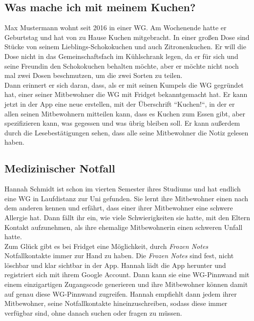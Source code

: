 \documentclass[a4paper]{scrreprt}
\begin{document}
        \subsection{Was mache ich mit meinem Kuchen?}
        Max Mustermann wohnt seit 2016 in einer WG. Am Wochenende hatte er Geburtstag und hat von zu Hause Kuchen mitgebracht. In einer großen Dose sind Stücke von seinem Lieblings-Schokokuchen und auch Zitronenkuchen. Er will die Dose nicht in das Gemeinschaftsfach im Kühlschrank legen, da er für sich und seine Freundin den Schokokuchen behalten möchte, aber er möchte nicht noch mal zwei Dosen beschmutzen, um die zwei Sorten zu teilen.\\
        Dann erinnert er sich daran, dass, als er mit seinen Kumpels die WG gegründet hat, einer seiner Mitbewohner die WG mit Fridget bekanntgemacht hat. Er kann jetzt in der App eine neue  erstellen, mit der Überschrift ``Kuchen!“, in der er allen seinen Mitbewohnern mitteilen kann, dass es Kuchen zum Essen gibt, aber spezifizieren kann, was gegessen und was übrig bleiben soll. Er kann außerdem durch die Lesebestätigungen sehen, dass alle seine Mitbewohner die Notiz gelesen haben.
        \\
        
        \subsection{Medizinischer Notfall}
        Hannah Schmidt ist schon im vierten Semester ihres Studiums und hat endlich eine WG in Laufdistanz zur Uni gefunden. Sie lernt ihre Mitbewohner einen nach dem anderen kennen und erfährt, dass einer ihrer Mitbewohner eine schwere Allergie hat. Dann fällt ihr ein, wie viele Schwierigkeiten sie hatte, mit den Eltern Kontakt aufzunehmen, als ihre ehemalige Mitbewohnerin einen schweren Unfall hatte.\\
        Zum Glück gibt es bei Fridget eine Möglichkeit, durch \textit{Frozen Notes} Notfallkontakte immer zur Hand zu haben. Die \textit{Frozen Notes} sind fest, nicht löschbar und klar sichtbar in der App. Hannah lädt die App herunter und registriert sich mit ihrem Google Account. Dann kann sie eine WG-Pinnwand mit einem einzigartigen Zugangscode generieren und ihre Mitbewohner können damit auf genau diese WG-Pinnwand zugreifen. Hannah empfiehlt dann jedem ihrer Mitbewohner, seine Notfallkontakte hineinzuschreiben, sodass diese immer verfügbar sind, ohne danach suchen oder fragen zu müssen.
        \newpage
        
\end{document}
